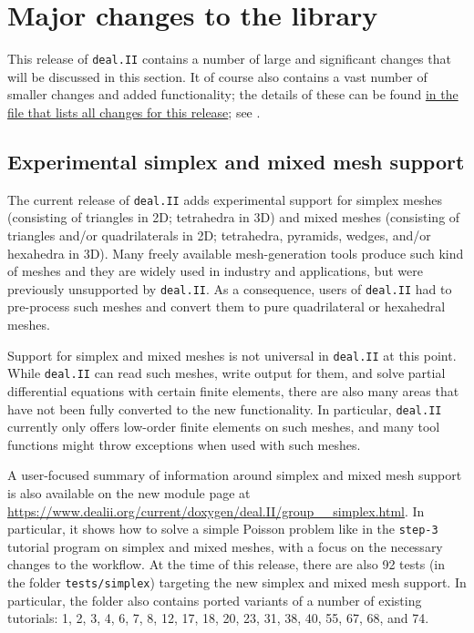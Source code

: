 \documentclass{ansarticle-preprint}
\newcommand{\specialword}[1]{\texttt{#1}}
\newcommand{\dealii}{{\specialword{deal.II}}\xspace}
\begin{document}
\section{Major changes to the library}
\label{sec:major}

This release of \dealii{} contains a number of large and significant changes
that will be discussed in this section.
It of course also contains a
vast number of smaller changes and added functionality; the details of these
can be found
\href{https://dealii.org/developer/doxygen/deal.II/changes_between_9_2_0_and_9_3_0.html}
{in the file that lists all changes for this release}; see \cite{changes93}.


\subsection{Experimental simplex and mixed mesh support}
\label{subsec:simplex}

The current release of \dealii adds experimental support for simplex
meshes (consisting of triangles in 2D; tetrahedra in 3D) and mixed meshes (consisting of triangles and/or
quadrilaterals in 2D; tetrahedra, pyramids, wedges, and/or hexahedra in 3D).
Many freely available mesh-generation tools produce such kind of
meshes and they are widely used in industry and applications, but were
previously unsupported by \dealii. As a consequence, users of \dealii
had to pre-process such meshes and convert them to pure quadrilateral
or hexahedral meshes.

Support for simplex and mixed meshes is not universal in \dealii{} at
this point. While \dealii{} can read such meshes, write output for
them, and solve partial differential equations with certain finite
elements, there are also many areas that have not been fully converted
to the new functionality. In particular, \dealii{} currently only
offers low-order finite elements on such meshes, and many tool
functions might throw exceptions when used with such meshes.


A user-focused summary of information around simplex and mixed mesh
support is also available on the new module page at
  \url{https://www.dealii.org/current/doxygen/deal.II/group__simplex.html}.
In particular, it shows how to solve a simple Poisson problem like in
the \texttt{step-3} tutorial program
on simplex and mixed meshes, with a focus on the necessary changes to
the workflow.
At the time of this release, there are also 92 tests (in the folder \texttt{tests/simplex})
targeting the new simplex and mixed mesh support. In particular, the folder also
contains ported variants of a number of existing tutorials: 1, 2, 3, 4, 6, 7, 8, 12, 17, 18, 20, 23, 31, 38,
40, 55, 67, 68, and 74.
\end{document}
